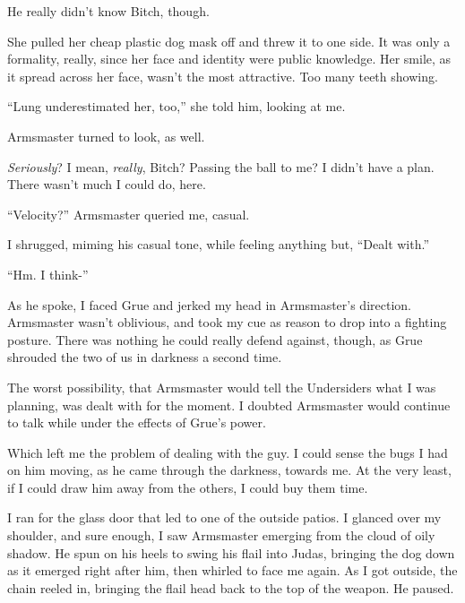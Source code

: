 He really didn't know Bitch, though.



She pulled her cheap plastic dog mask off and threw it to one side.  It was only a formality, really, since her face and identity were public knowledge.  Her smile, as it spread across her face, wasn't the most attractive.  Too many teeth showing.



``Lung underestimated her, too,'' she told him, looking at me.



Armsmaster turned to look, as well.



\emph{Seriously}?  I mean, \emph{really}, Bitch?  Passing the ball to me?  I didn't have a plan.  There wasn't much I could do, here.



``Velocity?''  Armsmaster queried me, casual.



I shrugged, miming his casual tone, while feeling anything but, ``Dealt with.''



``Hm.  I think-''



As he spoke, I faced Grue and jerked my head in Armsmaster's direction.  Armsmaster wasn't oblivious, and took my cue as reason to drop into a fighting posture.  There was nothing he could really defend against, though, as Grue shrouded the two of us in darkness a second time.



The worst possibility, that Armsmaster would tell the Undersiders what I was planning, was dealt with for the moment.  I doubted Armsmaster would continue to talk while under the effects of Grue's power.



Which left me the problem of dealing with the guy.  I could sense the bugs I had on him moving, as he came through the darkness, towards me.  At the very least, if I could draw him away from the others, I could buy them time.



I ran for the glass door that led to one of the outside patios.  I glanced over my shoulder, and sure enough, I saw Armsmaster emerging from the cloud of oily shadow.  He spun on his heels to swing his flail into Judas, bringing the dog down as it emerged right after him, then whirled to face me again.  As I got outside, the chain reeled in, bringing the flail head back to the top of the weapon.  He paused.



